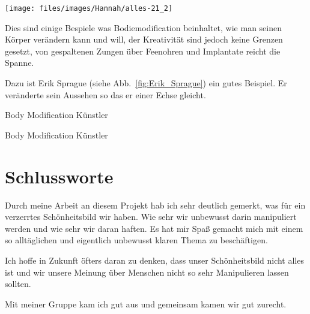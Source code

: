 \begin{figurewrapper}
	\texttt{[image: files/images/Hannah/alles-21\_2]}%
\end{figurewrapper}

Dies sind einige Bespiele was Bodiemodification beinhaltet, wie man seinen Körper verändern kann und
will, der Kreativität sind jedoch keine Grenzen gesetzt,
von gespaltenen Zungen über Feenohren und Implantate
reicht die Spanne.

Dazu ist Erik Sprague (siehe Abb.~\vref{fig:Erik_Sprague}) ein gutes
Beispiel. Er veränderte sein Aussehen so das er einer Echse gleicht.


\begin{figurewrapper}
	 \hfill
	\caption{Body Modification Künstler}
\end{figurewrapper}

\begin{figurewrapper}
	 \hfill
	\caption{Body Modification Künstler}
\end{figurewrapper}

\clearpage
\section{Schlussworte}
Durch meine Arbeit an diesem Projekt hab ich sehr deutlich gemerkt, was für ein verzerrtes
Schönheitsbild wir haben. Wie
sehr wir unbewusst darin manipuliert werden und wie sehr wir daran haften.
Es hat mir Spaß gemacht mich mit einem so alltäglichen und eigentlich unbewusst klaren Thema zu
beschäftigen.

Ich hoffe in Zukunft öfters daran zu denken, dass unser Schönheitsbild nicht alles ist
und wir unsere Meinung über Menschen nicht so sehr Manipulieren lassen sollten.

Mit meiner Gruppe kam ich gut aus und gemeinsam kamen wir gut zurecht.

\nocite{
	koerperkultur:korper-und-mode-korperinszenierung,
	Mueller:im_kampf_mit_dem_eigenen_koerper,
	Spiegel:body-modification-lust-am-horror-koerper,
	Lotze:Bodymodification.org,
	Wikipedia:Lippenteller,
	Wikipedia:Padaung,
	sweetminds:schonheitsideale-im-wandel,
	Wikipedia:Attraktivitaetsforschung,
	Wikipedia:Attraktivitaet,
	Wikipedia:Schoenheitsideal,
	crossdress:schonheitsideale-im-wandel,
	rpi-ekhn:Schoenheitsideale,
	Moeller:Schoenheitsformel,
	beautycheck.de:Durchschnittsgesichter,
}

\clearpage
\printbibliography[heading=source,keyword=Hannah]
